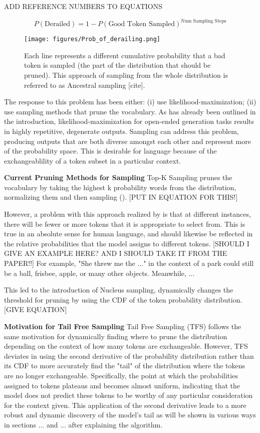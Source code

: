 \documentclass{article}
\begin{document}
 ADD REFERENCE NUMBERS TO EQUATIONS 

$$P(\text{Derailed})=1-P(\text{Good Token Sampled})^{\text{Num Sampling Steps}}$$

\begin{figure}[h]
    \texttt{[image: figures/Prob\_of\_derailing.png]}
    \caption{Each line represents a different cumulative probability that a bad token is sampled (the part of the distribution that should be pruned). This approach of sampling from the whole distribution is referred to as Ancestral sampling [cite].}
    \label{fig:derailingProb}
\end{figure}

The response to this problem has been either: (i) use likelihood-maximization; (ii) use sampling methods that prune the vocabulary. As has already been outlined in the introduction, likelihood-maximization for open-ended generation tasks results in highly repetitive, degenerate outputs. Sampling can address this problem, producing outputs that are both diverse amongst each other and represent more of the probability space. This is desirable for language because of the exchangeablility of a token subset in a particular context. 

\textbf{Current Pruning Methods for Sampling}
Top-K Sampling prunes the vocabulary by taking the highest k probability words from the distribution, normalizing them and then sampling (\cite{TopKandWritingPrompts}). [PUT IN EQUATION FOR THIS!]

However, a problem with this approach realized by \cite{Nucleus} is that at different instances, there will be fewer or more tokens that it is appropriate to select from. This is true in an absolute sense for human language, and should likewise be reflected in the relative probabilities that the model assigns to different tokens.
[SHOULD I GIVE AN EXAMPLE HERE? AND I SHOULD TAKE IT FROM THE PAPER!!]  For example, "She threw me the ..." in the context of a park could still be a ball, frisbee, apple, or many other objects. Meanwhile, ... 

This led to the introduction of Nucleus sampling, dynamically changes the threshold for pruning by using the CDF of the token probability distribution. [GIVE EQUATION]

\textbf{Motivation for Tail Free Sampling}
Tail Free Sampling (TFS) follows the same motivation for dynamically finding where to prune the distribution depending on the context of how many tokens are exchangeable. However, TFS deviates in using the second derivative of the probability distribution rather than its CDF to more accurately find the "tail" of the distribution where the tokens are no longer exchangeable. Specifically, the point at which the probabilities assigned to tokens plateaus and becomes almost uniform, indicating that the model does not predict these tokens to be worthy of any particular consideration for the context given. This application of the second derivative leads to a more robust and dynamic discovery of the model's tail as will be shown in various ways in sections ... and ... after explaining the algorithm.
\end{document}
